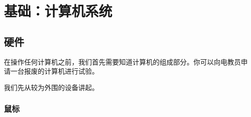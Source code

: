 \part{基础：计算机系统}
\chapter{硬件}
在操作任何计算机之前，我们首先需要知道计算机的组成部分。你可以向电教员申请一台报废的计算机进行试验。\par
我们先从较为外围的设备讲起。
\section{鼠标}
